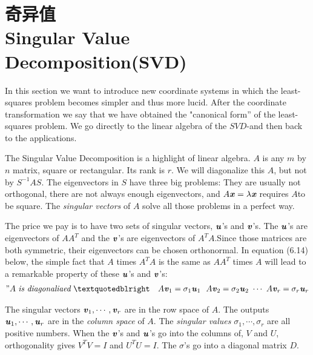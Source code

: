 \section[奇异值]{奇异值\\Singular Value Decomposition(SVD)}
\begin{flushleft}
	In this section we want to introduce new coordinate systems in which the least-squares problem becomes simpler and thus more lucid. After the coordinate transformation we say that we have obtained the "canonical form” of the least-squares problem. We go directly to the linear algebra of the $SVD$-and then back to the applications.
\end{flushleft}
The Singular Value Decomposition is a highlight of linear algebra. $A$ is any $m$ by $n$ matrix, square or rectangular. Its rank is $r$. We will diagonalize this $A$, but not by $S^{-1}AS$. The eigenvectors in $S$ have three big problems: They are usually not orthogonal, there are not always enough eigenvectors, and $ A\textbf{\textit{x}}=\lambda\textit{\textbf{x}}$ requires $A $to be square. The \textit{singular vectors} of $A$ solve all those problems in a perfect way.

The price we pay is to have two sets of singular vectors, $\textbf{\textit{u}}$'s and $\textbf{\textit{v}}$'s. The $\textbf{\textit{u}}$'s are eigenvectors of $AA^{T}$ and the $\textbf{\textit{v}}$'s are eigenvectors of $A^{T}A$.Since those matrices are both symmetric, their eigenvectors can be chosen orthonormal. In equation (6.14) below, the simple fact that $A$ times $A^{T}A$ is the same as $AA^{T}$ times $A$ will lead to a remarkable property of these $\textbf{\textit{u}}$'s and $\textbf{\textit{v}}$'s:
\begin{align}
" A \ \textit{is diagonaliaed}\  \textquotedblright \ \ \ 
A\textbf{\textit{v}}_{1}=\sigma_{1}\textbf{\textit{u}}_{1} \ \ 
A\textbf{\textit{v}}_{2}=\sigma_{2}\textbf{\textit{u}}_{2} \ \cdots \ 
A\textbf{\textit{v}}_{r}=\sigma_{r}\textbf{\textit{u}}_{r}
\end{align}

\begin{flushleft}
	The singular vectors $\textbf{\textit{v}}_{1},\cdots,\textbf{\textit{v}}_{r}$ are in the row space of $A$. The outputs $\textbf{\textit{u}}_{1},\cdots,\textbf{\textit{u}}_{r}$ are in the \textit{column space} of $A$. The \textit{singular values} $ \sigma_{1},\cdots,\sigma_{r}$ are all positive numbers. When the $\textbf{\textit{v}}$'s and $\textbf{\textit{u}}$'s go into the columns of, $V$ and $U$, orthogonality gives $V^{T}V=I$ and $U^{T }U=I$. The $\sigma$'s go into a diagonal matrix $D$.
\end{flushleft}

